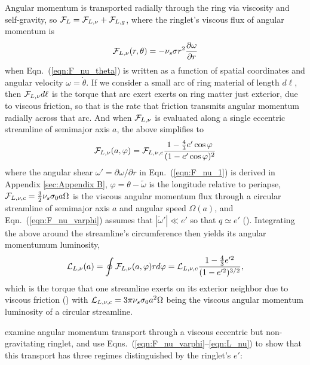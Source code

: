 \documentclass[preprint]{aastex62}
\begin{document}
Angular momentum is transported radially through the ring via viscosity and self-gravity, 
so ${\cal F}_L={\cal F}_{L,\nu} + {\cal F}_{L,g}$,
where the ringlet's viscous flux of angular momentum is
\begin{equation}
    \label{eqn:F_nu_1}
    {\cal F}_{L,\nu}(r, \theta) = -\nu_s \sigma r^2\frac{\partial\omega}{\partial r}
\end{equation}
when Eqn.\ (\ref{eqn:F_nu_theta}) is written as a function of spatial coordinates and
angular velocity $\omega=\dot{\theta}$. 
If we consider a small arc of  ring material of length $d\ell$, 
then ${\cal F}_{L,\nu}d\ell$ is the torque that arc exert exerts on
ring matter just exterior, due to viscous friction,
so that is the rate that friction transmits angular momentum radially across that arc.
And when ${\cal F}_{L,\nu}$ is evaluated along a single eccentric streamline of semimajor axis $a$, 
the above simplifies to
\begin{equation}
    \label{eqn:F_nu_varphi}
    {\cal F}_{L,\nu}(a, \varphi) = {\cal F}_{L,\nu,c}\frac{1-\frac{4}{3}e'\cos\varphi}{(1-e'\cos\varphi)^2}
\end{equation}
where the angular shear $\omega'=\partial\omega/\partial r$ in Eqn.\ (\ref{eqn:F_nu_1})
is derived in Appendix \ref{sec:Appendix B},
$\varphi=\theta-\tilde{\omega}$ is the longitude relative to periapse,
${\cal F}_{L,\nu,c}=\frac{3}{2}\nu_s\sigma_0a\Omega$ is the viscous angular momentum flux through a
circular streamline of semimajor axis $a$ and angular speed $\Omega(a)$,
and Eqn.\ (\ref{eqn:F_nu_varphi}) assumes that $|\tilde{\omega}'|\ll e'$ so that $q\simeq e'$
(\citealt{BGT82}). Integrating the above
around the streamline's circumference then yields its angular momentumum luminosity,
\begin{equation}
    \label{eqn:L_nu}
    {\cal L}_{L,\nu}(a) = \oint {\cal F}_{L,\nu}(a, \varphi)rd\varphi = {\cal L}_{L,\nu,c}\frac{1-\frac{4}{3}e'^2}{(1-e'^2)^{3/2}},
\end{equation}
which is the torque that one streamline exerts on its exterior neighbor due to viscous friction
(\citealt{BGT82}) with ${\cal L}_{L,\nu,c}=3\pi\nu_s\sigma_0a^2\Omega$
being the viscous angular momentum luminosity of a circular streamline.

\citet{BGT82} examine angular momentum transport through a viscous eccentric but non-gravitating ringlet, 
and use Eqns.\ (\ref{eqn:F_nu_varphi}--\ref{eqn:L_nu}) to show that this transport has three 
regimes distinguished by the ringlet's $e'$:
\end{document}
